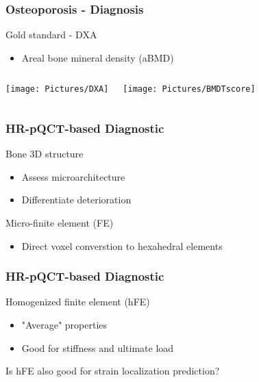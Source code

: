 \documentclass[xcolor=table,11pt]{beamer}
\begin{document}
	\begin{frame}
		\frametitle{Osteoporosis - Diagnosis}

		Gold standard - DXA
		\begin{itemize}
			\item Areal bone mineral density (aBMD)
		\end{itemize}

		\begin{columns}
			\centering
			\texttt{[image: Pictures/DXA]}\\
			\tiny{\cite{p1}}

			\centering
			\texttt{[image: Pictures/BMDTscore]}\\
			\tiny{\cite{p1}}

		\end{columns}

	\end{frame}



	\begin{frame}
		\frametitle{HR-pQCT-based Diagnostic}

		Bone 3D structure
		\begin{itemize}
			\item Assess microarchitecture
			\item Differentiate deterioration
		\end{itemize}

		\vfill

		Micro-finite element (\si{\mu}FE)
		\begin{itemize}
			\item Direct voxel converstion to hexahedral elements
		\end{itemize}

	\end{frame}

	\begin{frame}
		\frametitle{HR-pQCT-based Diagnostic}

		Homogenized finite element (hFE)
		\begin{itemize}
			\item "Average" properties
			\item Good for stiffness and ultimate load
		\end{itemize}

		\vfill
		Is hFE also good for strain localization prediction?\\\cite{p1}
	\end{frame}
\end{document}
